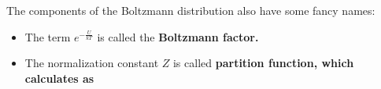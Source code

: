\documentclass[class=article, crop=false, 12pt]{standalone}
\begin{document}
The components of the Boltzmann distribution also have some fancy names:
\begin{itemize}
    \item The term $e^{-\frac{U}{kT}}$ is called the \bf{Boltzmann factor}.
    
    \item The normalization constant $Z$ is called \bf{partition function}, which calculates as

\end{itemize}
\end{document}
